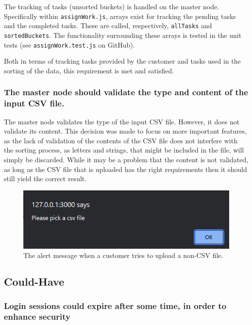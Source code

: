 The tracking of tasks (unsorted buckets) is handled on the master node. Specifically within \lstinline{assignWork.js}, arrays exist for tracking the pending tasks and the completed tasks. These are called, respectively, \lstinline{allTasks} and \lstinline{sortedBuckets}. The functionality surrounding these arrays is tested in the unit tests (see \lstinline{assignWork.test.js} on GitHub).

Both in terms of tracking tasks provided by the customer and tasks used in the sorting of the data, this requirement is met and satisfied.

\subsubsection{The master node should validate the type and content of the input CSV file.}
The master node validates the type of the input CSV file. However, it does not validate its content. This decision was made to focus on more important features, as the lack of validation of the contents of the CSV file does not interfere with the sorting process, as letters and strings, that might be included in the file, will simply be discarded. While it may be a problem that the content is not validated, as long as the CSV file that is uploaded has the right requirements then it should still yield the correct result. 

\begin{figure} [H]
    \centering
    \includegraphics[scale=.75]{figures/fileMustBeCSV.png}
    \caption{The alert message when a customer tries to upload a non-CSV file.}
    \label{fig:fileMustBeCSV}
\end{figure}
\subsection{Could-Have}

\subsubsection{Login sessions could expire after some time, in order to enhance security}


